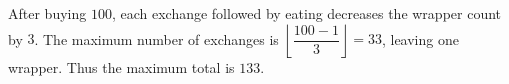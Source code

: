 After buying $100$, each exchange followed by eating decreases the wrapper count by $3$. The maximum number of exchanges is $\left\lfloor\dfrac{100-1}{3}\right\rfloor=33$, leaving one wrapper. Thus the maximum total is $\boxed{133}$.
